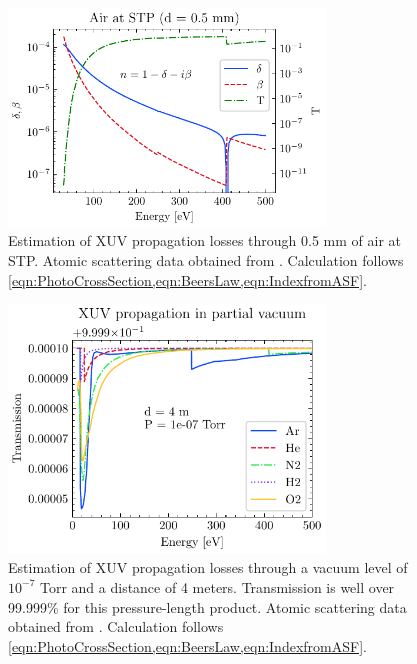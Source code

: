 \begin{figure}
	\centering
	\includegraphics[width=0.75\textwidth]{figures/chap2/AirAbs.pdf}
	\caption{Estimation of XUV propagation losses through 0.5 mm of air at STP. Atomic scattering data obtained from \cite{gulliksonCXROXRayInteractions,henkeXRayInteractionsPhotoabsorption1993}. Calculation follows \cref{eqn:PhotoCrossSection,eqn:BeersLaw,eqn:IndexfromASF}.}
	\label{fig:AirAbs}
\end{figure}

\begin{figure}
	\centering
	\includegraphics[width=0.75\textwidth]{figures/chap2/XUVinVacuum.pdf}
	\caption{Estimation of XUV propagation losses through a vacuum level of $10^{-7}$ Torr and a distance of 4 meters. Transmission is well over 99.999\% for this pressure-length product. Atomic scattering data obtained from \cite{gulliksonCXROXRayInteractions,henkeXRayInteractionsPhotoabsorption1993}. Calculation follows \cref{eqn:PhotoCrossSection,eqn:BeersLaw,eqn:IndexfromASF}.}
	\label{fig:XUVinVacuum}
\end{figure}

